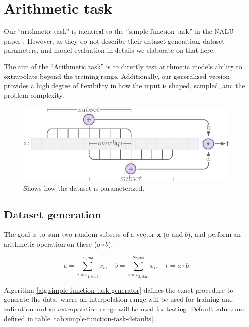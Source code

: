 \section{Arithmetic task}

Our ``arithmetic task'' is identical to the ``simple function task'' in the NALU paper \cite{trask-nalu}. However, as they do not describe their dataset generation, dataset parameters, and model evaluation in details we elaborate on that here.

The aim of the ``Arithmetic task'' is to directly test arithmetic models ability to extrapolate beyond the training range. Additionally, our generalized version provides a high degree of flexibility in how the input is shaped, sampled, and the problem complexity.

\begin{figure}[h]
\centering
\includegraphics[scale=0.7]{graphics/function_task_static_problem.pdf}
\caption{Shows how the dataset is parameterized.}
\label{fig:simple-function-task-problem}
\end{figure}

\subsection{Dataset generation}
\label{sec:appendix:simple-function-task:data-generation}

The goal is to sum two random subsets of a vector $\mathbf{x}$ ($a$ and $b$), and perform an arithmetic operation on these ($a \circ b$).

\begin{equation}
    a = \sum_{i=s_{1,\mathrm{start}}}^{s_{1,\mathrm{end}}} x_i, \quad b = \sum_{i=s_{2,\mathrm{start}}}^{s_{2,\mathrm{end}}} x_i, \quad t = a \circ b
\end{equation}

Algorithm \ref{alg:simple-function-task-generator} defines the exact procedure to generate the data, where an interpolation range will be used for training and validation and an extrapolation range will be used for testing. Default values are defined in table \ref{tab:simple-function-task-defaults}.

